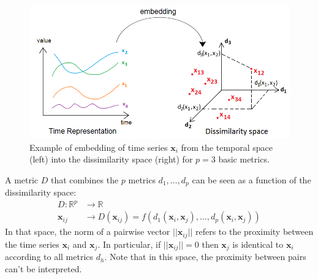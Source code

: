 \begin{figure}[h!]
	\begin{minipage}[b]{1.0\linewidth}
		\centering
		\includegraphics[width=0.85\linewidth]{images/PairwiseEmbedding2}
	\end{minipage}
	\caption{Example of embedding of time series $\textbf{x}_i$ from the temporal space (left) into the dissimilarity space (right) for $p=3$ basic metrics.}
	\label{fig:PairwiseEmbedding}
\end{figure}

\noindent A metric $D$ that combines the $p$ metrics $d_1, \ldots, d_p$ can be seen as a function of the dissimilarity space: 
\begin{equation}
\begin{aligned}
D : \mathbb{R}^p & \rightarrow \mathbb{R} \\
\textbf{x}_{ij} & \rightarrow D(\textbf{x}_{ij}) = f(d_1(\textbf{x}_i, \textbf{x}_j), \ldots , d_p(\textbf{x}_i, \textbf{x}_j))
\end{aligned}
\label{eq:metric}
\end{equation}
In that space, the norm of a pairwise vector $||\textbf{x}_{ij}||$ refers to the proximity between the time series $\textbf{x}_i$ and $\textbf{x}_j$. In particular, if $||\textbf{x}_{ij}||=0$ then $\textbf{x}_j$ is identical to $\textbf{x}_i$ according to all metrics $d_h$. Note that in this space, the proximity between pairs can't be interpreted.

